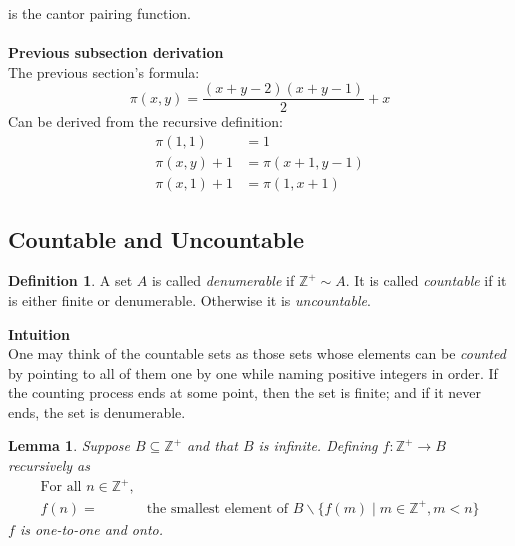 \documentclass{report}
\newtheorem*{lemma}{Lemma}
\theoremstyle{definition}
\newtheorem*{definition}{Definition}
\begin{document}
is the cantor pairing function.\\
\vspace{1mm}\\
\textbf{Previous subsection derivation}\\
The previous section's formula:
\begin{equation*}
\pi(x,y)=\frac{(x+y-2)(x+y-1)}{2}+x
\end{equation*}
Can be derived from the recursive definition:
\begin{align*}
\pi(1,1)&=1\\
\pi(x,y)+1&=\pi(x+1,y-1)\\
\pi(x,1)+1&=\pi(1,x+1)
\end{align*}
\newpage

\subsection{Countable and Uncountable}
\begin{definition}
A set $A$ is called \textit{denumerable} if $\mathbb Z^+\sim A$. It is called \textit{countable} if it is either finite or denumerable. Otherwise it is \textit{uncountable}.
\end{definition}
\noindent\textbf{Intuition}\\
One may think of the countable sets as those sets whose elements can be \textit{counted} by pointing to all of them
one by one while naming positive integers in order. If the counting process ends at some point, then the set is 
finite; and if it never ends, the set is denumerable.
\begin{lemma}
Suppose $B\subseteq\mathbb Z^+$ and that $B$ is infinite. Defining $f:\mathbb Z^+\to B$ recursively as
\begin{align*}
\text{For all $n\in\mathbb Z^+$},&\\
f(n)=&\text{the smallest element of } B\backslash\{f(m)\mid m\in\mathbb Z^+,m<n\}
\end{align*}
$f$ is one-to-one and onto.
\end{lemma}
\end{document}
